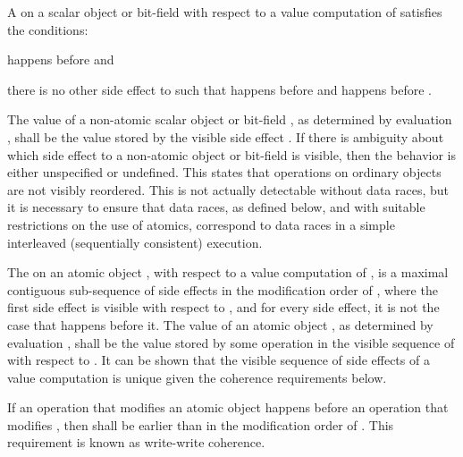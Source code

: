 \pnum
A   on a scalar object or bit-field 
with respect to a value computation  of  satisfies the
conditions:

\begin{compactitem}
\item {} happens before  and
\item there is no other
%
side effect  to  such that 
happens before  and  happens before .
\end{compactitem}
%
The value of a non-atomic scalar object or bit-field , as determined by
evaluation , shall be the value stored by the
%
visible side effect
. \enternote If there is ambiguity about which side effect to a
non-atomic object or bit-field is visible, then the behavior is either
unspecified or undefined. \exitnote \enternote This states that operations on
ordinary objects are not visibly reordered. This is not actually detectable
without data races, but it is necessary to ensure that data races, as defined
below, and with suitable restrictions on the use of atomics, correspond to data
races in a simple interleaved (sequentially consistent) execution. \exitnote

\pnum
The 
on an atomic object , with
respect to a
%
value computation  of , is a maximal contiguous
sub-sequence of
%
side effects in the modification order of , where the
first
%
side effect is visible with respect to , and for every side
effect, it is not the case that  happens before it. The value of an
atomic object , as determined by evaluation , shall be the value
stored by some operation in the visible sequence of  with respect to
. \enternote It can be shown that the visible sequence of
%
side effects
of a value computation is unique given the coherence requirements below.
\exitnote

\pnum
If an operation  that modifies an atomic object  happens before
an operation  that modifies , then  shall be earlier
than  in the modification order of . \enternote This requirement
is known as write-write coherence. \exitnote

